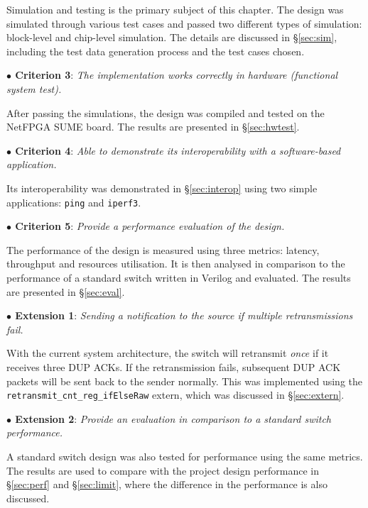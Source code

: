 Simulation and testing is the primary subject of this chapter. The design was simulated through various test cases and passed two different types of simulation: block-level and chip-level simulation. The details are discussed in \S\ref{sec:sim}, including the test data generation process and the test cases chosen.

\textbf{$\bullet$ Criterion 3}: \textit{The implementation works correctly in hardware (functional system test).}

After passing the simulations, the design was compiled and tested on the NetFPGA SUME board. The results are presented in \S\ref{sec:hwtest}.

\textbf{$\bullet$ Criterion 4}: \textit{Able to demonstrate its interoperability with a software-based application.}

Its interoperability was demonstrated in \S\ref{sec:interop} using two simple applications: \verb|ping| and \verb|iperf3|.

\textbf{$\bullet$ Criterion 5}: \textit{Provide a performance evaluation of the design.}

The performance of the design is measured using three metrics: latency, throughput and resources utilisation. It is then analysed in comparison to the performance of a standard switch written in Verilog \cite{refswitch, refswitchbf} and evaluated. The results are presented in \S\ref{sec:eval}.

\textbf{$\bullet$ Extension 1}: \textit{Sending a notification to the source if multiple retransmissions fail.}

With the current system architecture, the switch will retransmit \textit{once} if it receives three DUP ACKs. If the retransmission fails, subsequent DUP ACK packets will be sent back to the sender normally. This was implemented using the \verb|retransmit_cnt_reg_ifElseRaw| extern, which was discussed in \S\ref{sec:extern}.

\textbf{$\bullet$ Extension 2}: \textit{Provide an evaluation in comparison to a standard switch performance.}

A standard switch design \cite{refswitch, refswitchbf} was also tested for performance using the same metrics. The results are used to compare with the project design performance in \S\ref{sec:perf} and \S\ref{sec:limit}, where the difference in the performance is also discussed.

